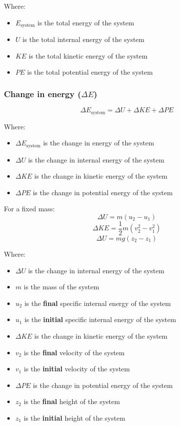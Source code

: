 \documentclass[11pt]{article}
\begin{document}
Where:
\begin{itemize}
\item \(E_{\text{system}}\) is the total energy of the system
\item \(U\) is the total internal energy of the system
\item \(KE\) is the total kinetic energy of the system
\item \(PE\) is the total potential energy of the system
\end{itemize}

\newpage

\subsubsection{Change in energy (\(\Delta E\))}
\label{sec:org8bd9c69}
\[\Delta E_{\text{system}} = \Delta U + \Delta KE + \Delta PE\]

Where:
\begin{itemize}
\item \(\Delta E_{\text{system}}\) is the change in energy of the system
\item \(\Delta U\) is the change in internal energy of the system
\item \(\Delta KE\) is the change in kinetic energy of the system
\item \(\Delta PE\) is the change in potential energy of the system
\end{itemize}

For a fixed mass:
\[\Delta U = m (u_2 - u_1)\]
\[\Delta KE = \frac{1}{2} m (v_2^2 - v_1^2)\]
\[\Delta U = mg (z_2 - z_1)\]

Where:
\begin{itemize}
\item \(\Delta U\) is the change in internal energy of the system
\item \(m\) is the mass of the system
\item \(u_2\) is the \textbf{final} specific internal energy of the system
\item \(u_1\) is the \textbf{initial} specific internal energy of the system
\item \(\Delta KE\) is the change in kinetic energy of the system
\item \(v_2\) is the \textbf{final} velocity of the system
\item \(v_1\) is the \textbf{initial} velocity of the system
\item \(\Delta PE\) is the change in potential energy of the system
\item \(z_2\) is the \textbf{final} height of the system
\item \(z_1\) is the \textbf{initial} height of the system
\end{itemize}
\end{document}
